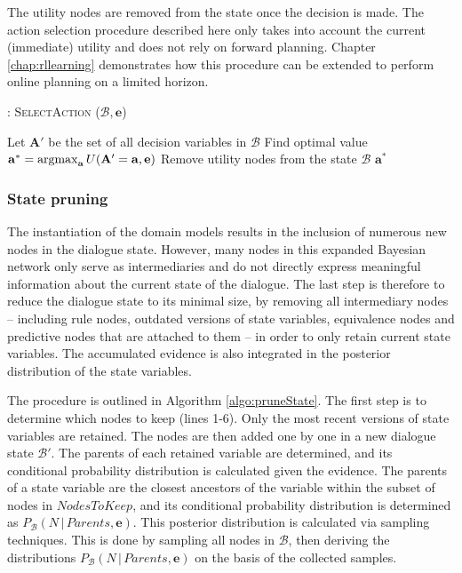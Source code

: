 The utility nodes are removed from the state once the decision is made. The action selection procedure described here only takes into account the current (immediate) utility and does not rely on forward planning.  Chapter \ref{chap:rllearning} demonstrates how this procedure can be extended to perform online planning on a limited horizon. 


\begin{algorithm}[t]
\caption{: \textsc{SelectAction} ($\mathcal{B}, \mathbf{e}$)}
\begin{algorithmic}[1] \vspace{1mm}
\STATE Let $\mathbf{A}'$ be the set of all decision variables in $\mathcal{B}$
\STATE Find optimal value $\mathbf{a}^* = \argmax_{\mathbf{a}} U(\mathbf{A}' = \mathbf{a}, \mathbf{e})$
\STATE Remove utility nodes from the state $\mathcal{B}$
\RETURN $\mathbf{a}^*$
\end{algorithmic}
\label{algo:actionselection}
\end{algorithm}

\subsubsection*{State pruning}

The instantiation of the domain models results in the inclusion of numerous new nodes in the dialogue state. However, many nodes in this expanded Bayesian network  only serve as intermediaries and do not directly express meaningful information about the current state of the dialogue. The last step is therefore to reduce the dialogue state to its minimal size, by removing all intermediary nodes -- including rule nodes, outdated versions of state variables, equivalence nodes and predictive nodes that are attached to them -- in order to only retain current state variables. The accumulated evidence is also integrated in the posterior distribution of the state variables.

The procedure is outlined in Algorithm \ref{algo:pruneState}. The first step is to determine which nodes to keep (lines 1-6).  Only the most recent versions of state variables are retained. 
The nodes are then added one by one in a new dialogue state $\mathcal{B}'$.  The parents of each retained variable are determined, and its conditional probability distribution is calculated given the evidence.  The parents of a state variable are the closest ancestors of the variable within the subset of nodes in $\mathit{NodesToKeep}$, and its conditional probability distribution is determined as $P_{\mathcal{B}}(N \, | \, \mathit{Parents}, \mathbf{e})$.  This posterior distribution is calculated via sampling techniques. This is done by sampling all nodes in $\mathcal{B}$, then deriving the distributions $P_{\mathcal{B}}(N \, | \, \mathit{Parents}, \mathbf{e})$ on the basis of the collected samples.  

